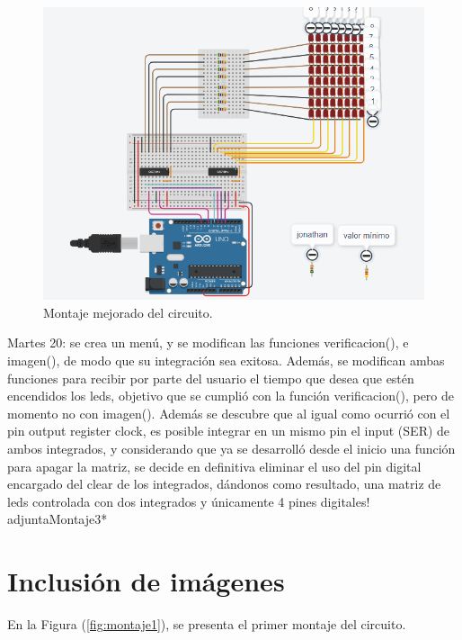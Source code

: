 \documentclass{article}
\begin{document}
 \begin{figure}[h]
\includegraphics[width=16cm]{montaje2.png}
\centering
\caption{Montaje mejorado del circuito.}
\label{fig:montaje2}
\end{figure}
 
Martes 20: se crea un menú, y se modifican las funciones verificacion(), e imagen(),  de modo que su integración sea exitosa. Además, se modifican ambas funciones para recibir por parte del usuario el tiempo que desea que estén encendidos los leds, objetivo que se cumplió con la función verificacion(), pero de momento no con imagen(). Además se descubre que al igual como ocurrió con el pin output register clock, es posible integrar en un mismo pin el input (SER) de ambos integrados, y considerando que ya se desarrolló desde el inicio una función para apagar la matriz, se decide en definitiva eliminar el uso del pin digital encargado del clear de los integrados, dándonos como resultado, una matriz de leds controlada con  dos integrados y únicamente 4 pines digitales! adjuntaMontaje3*
\section{Inclusión de imágenes} \label{imagenes}

En la Figura (\ref{fig:montaje1}), se presenta el primer montaje del circuito. 
\end{document}

